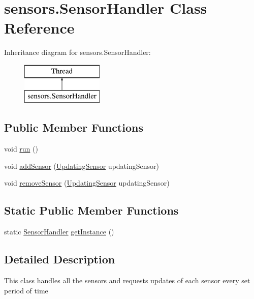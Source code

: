 \hypertarget{classsensors_1_1_sensor_handler}{\section{sensors.\-Sensor\-Handler Class Reference}
\label{classsensors_1_1_sensor_handler}
}
Inheritance diagram for sensors.\-Sensor\-Handler\-:\begin{figure}[H]
\begin{center}
\leavevmode
\includegraphics[height=2.000000cm]{classsensors_1_1_sensor_handler}
\end{center}
\end{figure}
\subsection*{Public Member Functions}
\begin{DoxyCompactItemize}
\item 
void \hyperlink{classsensors_1_1_sensor_handler_abf934699cf3b07eec525bd47acc887e7}{run} ()
\item 
void \hyperlink{classsensors_1_1_sensor_handler_a7ab54a96695c7e0374cebfca2dd6cc4d}{add\-Sensor} (\hyperlink{interfacesensors_1_1_updating_sensor}{Updating\-Sensor} updating\-Sensor)
\item 
void \hyperlink{classsensors_1_1_sensor_handler_a03c2a4215b0767097561dc76df0cb803}{remove\-Sensor} (\hyperlink{interfacesensors_1_1_updating_sensor}{Updating\-Sensor} updating\-Sensor)
\end{DoxyCompactItemize}
\subsection*{Static Public Member Functions}
\begin{DoxyCompactItemize}
\item 
static \hyperlink{classsensors_1_1_sensor_handler}{Sensor\-Handler} \hyperlink{classsensors_1_1_sensor_handler_ad3f54cd330faf0f9e999201b7fb347f0}{get\-Instance} ()
\end{DoxyCompactItemize}


\subsection{Detailed Description}
This class handles all the sensors and requests updates of each sensor every set period of time

